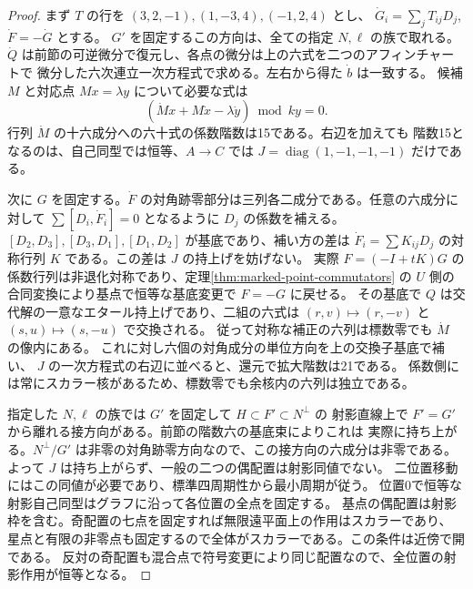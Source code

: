 \begin{proof}
まず $T$ の行を $(3,2,-1),(1,-3,4),(-1,2,4)$ とし、
$\dot G_i=\sum_jT_{ij}D_j$, $\dot F=-\dot G$ とする。
$G'$ を固定するこの方向は、全ての指定 $N,\ell$ の族で取れる。
$\dot Q$ は前節の可逆微分で復元し、各点の微分は上の六式を二つのアフィンチャートで
微分した六次連立一次方程式で求める。左右から得た $\dot b$ は一致する。
候補 $M$ と対応点 $Mx=\lambda y$ について必要な式は
\[
              (\dot Mx+M\dot x-\lambda\dot y)\bmod ky=0.
\]
行列 $\dot M$ の十六成分への六十式の係数階数は15である。右辺を加えても
階数15となるのは、自己同型では恒等、$A\to C$ では $J=\operatorname{diag}(1,-1,-1,-1)$ だけである。

次に $G$ を固定する。$\dot F$ の対角跡零部分は三列各二成分である。任意の六成分に対して
$\sum[D_i,\dot F_i]=0$ となるように $D_j$ の係数を補える。
$[D_2,D_3],[D_3,D_1],[D_1,D_2]$ が基底であり、補い方の差は
$\dot F_i=\sum K_{ij}D_j$ の対称行列 $K$ である。この差は $J$ の持上げを妨げない。
実際 $F=(-I+tK)G$ の係数行列は非退化対称であり、定理\ref{thm:marked-point-commutators}
の $U$ 側の合同変換により基点で恒等な基底変更で $F=-G$ に戻せる。
その基底で $Q$ は交代解の一意なエタール持上げであり、二組の六式は
$(r,v)\mapsto(r,-v)$ と $(s,u)\mapsto(s,-u)$ で交換される。
従って対称な補正の六列は標数零でも $\dot M$ の像内にある。
これに対し六個の対角成分の単位方向を上の交換子基底で補い、
$J$ の一次方程式の右辺に並べると、還元で拡大階数は21である。
係数側には常にスカラー核があるため、標数零でも余核内の六列は独立である。

指定した $N,\ell$ の族では $G'$ を固定して $H\subset F'\subset N^\perp$ の
射影直線上で $F'=G'$ から離れる接方向がある。前節の階数六の基底束によりこれは
実際に持ち上がる。$N^\perp/G'$ は非零の対角跡零方向なので、この接方向の六成分は非零である。
よって $J$ は持ち上がらず、一般の二つの偶配置は射影同値でない。
二位置移動にはこの同値が必要であり、標準四周期性から最小周期が従う。
位置0で恒等な射影自己同型はグラフに沿って各位置の全点を固定する。
基点の偶配置は射影枠を含む。奇配置の七点を固定すれば無限遠平面上の作用はスカラーであり、
星点と有限の非零点も固定するので全体がスカラーである。この条件は近傍で開である。
反対の奇配置も混合点で符号変更により同じ配置なので、全位置の射影作用が恒等となる。
\end{proof}
